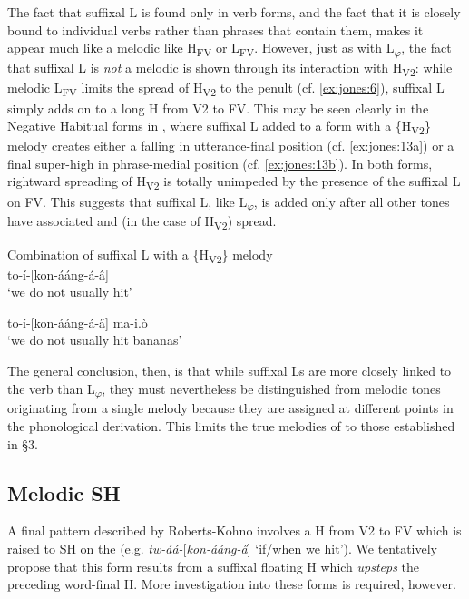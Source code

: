 \documentclass[output=paper,newtxmath,modfonts,nonflat,hidelinks]{langsci/langscibook}
\begin{document}
The fact that suffixal L is found only in verb forms, and the fact that it is closely bound to individual verbs rather than phrases that contain them, makes it appear much like a melodic  like H\textsubscript{FV} or L\textsubscript{FV}. However, just as with L\textsubscript{$\varphi $}, the fact that suffixal L is \textit{not} a melodic  is shown through its interaction with H\textsubscript{V2}: while melodic L\textsubscript{FV} limits the spread of H\textsubscript{V2} to the penult (cf. \ref{ex:jones:6}), suffixal L simply adds on to a long H  from V2 to FV. This may be seen clearly in the Negative Habitual forms in , where suffixal L added to a form with a \{H\textsubscript{V2}\} melody creates either a falling  in utterance-final position (cf. \ref{ex:jones:13a}) or a final super-high  in phrase-medial position (cf. \ref{ex:jones:13b}). In both forms, rightward spreading of H\textsubscript{V2} is totally unimpeded by the presence of the suffixal L on FV. This suggests that suffixal L, like L\textsubscript{$\varphi $}, is added only after all other tones have associated and (in the case of H\textsubscript{V2}) spread.

\ea\label{ex:jones:13}
{Combination of suffixal L with a \{H\textsubscript{V2}\} melody}\\
\ea\label{ex:jones:13a}
{to-í-[kon-ááng-á-â]} \\
\glt ‘we do not usually hit’

\ex\label{ex:jones:13b}
{to-í-[kon-ááng-á-\H{a}] ma-i.\`o}\\
\glt ‘we do not usually hit bananas’
\z
\z

The general conclusion, then, is that while suffixal Ls are more closely linked to the verb than L\textsubscript{$\varphi $},  they must nevertheless be distinguished from melodic tones originating from a single melody because they are assigned at different points in the phonological derivation. This limits the true melodies of  to those established in §3.

\subsection{Melodic SH}\label{sec:jones:4.4}
  A final  pattern described by Roberts-Kohno involves a H  from V2 to FV which is raised to SH on the  (e.g. \textit{tw-áá-}[\textit{kon-ááng-\H{a}}] ‘if/when we hit’). We tentatively propose that this form results from a suffixal floating H  which \textit{upsteps} the preceding word-final H. More investigation into these forms is required, however.
\end{document}

